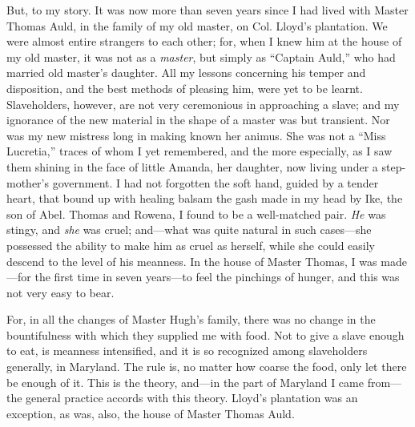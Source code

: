 But, to my story. It was now more than seven years since I had lived
with Master Thomas Auld, in the family of my old master, on Col. Lloyd's
plantation. We were almost entire strangers to each other; for, when I
knew him at the house of my old master, it was not as a \emph{master},
but simply as ``Captain Auld,'' who had married old master's daughter.
All my lessons concerning his temper and disposition, and the best
methods of pleasing him, were yet to be learnt. Slaveholders, however,
are not very ceremonious in approaching a slave; and my ignorance of the
new material in the shape of a master was but transient. Nor was my new
mistress long in making known her animus. She was not a ``Miss
Lucretia,'' traces of whom I yet remembered, and the more especially, as
I saw them shining in the face of little Amanda, her daughter, now
living under a step-mother's government. I had not forgotten the soft
hand, guided by a tender heart, that bound up with healing balsam the
gash made in my head by Ike, the son of Abel. Thomas and Rowena, I found
to be a well-matched pair. \emph{He} was stingy, and \emph{she} was
cruel; and---what was quite natural in such cases---she possessed the
ability to make him as cruel as herself, while she could easily descend
to the level of his meanness. In the house of Master Thomas, I was
made---for the first time in seven years---to feel the pinchings of
hunger, and this was not very easy to bear.

For, in all the changes of Master Hugh's family,
{\protect\hypertarget{188}{}{}}there was no change in the bountifulness
with which they supplied me with food. Not to give a slave enough to
eat, is meanness intensified, and it is so recognized among slaveholders
generally, in Maryland. The rule is, no matter how coarse the food, only
let there be enough of it. This is the theory, and---in the part of
Maryland I came from---the general practice accords with this theory.
Lloyd's plantation was an exception, as was, also, the house of Master
Thomas Auld.

